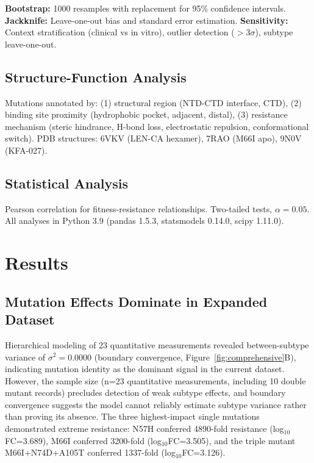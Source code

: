 \documentclass[preprint]{elsarticle}
\begin{document}
\textbf{Bootstrap:} 1000 resamples with replacement for 95\% confidence intervals. \textbf{Jackknife:} Leave-one-out bias and standard error estimation. \textbf{Sensitivity:} Context stratification (clinical vs in vitro), outlier detection ($>3\sigma$), subtype leave-one-out.

\subsection{Structure-Function Analysis}

Mutations annotated by: (1) structural region (NTD-CTD interface, CTD), (2) binding site proximity (hydrophobic pocket, adjacent, distal), (3) resistance mechanism (steric hindrance, H-bond loss, electrostatic repulsion, conformational switch). PDB structures: 6VKV (LEN-CA hexamer), 7RAO (M66I apo), 9N0V (KFA-027).

\subsection{Statistical Analysis}

Pearson correlation for fitness-resistance relationships. Two-tailed tests, $\alpha=0.05$. All analyses in Python 3.9 (pandas 1.5.3, statsmodels 0.14.0, scipy 1.11.0).

\section{Results}

\subsection{Mutation Effects Dominate in Expanded Dataset}

Hierarchical modeling of 23 quantitative measurements revealed between-subtype variance of $\sigma^2=0.0000$ (boundary convergence, Figure~\ref{fig:comprehensive}B), indicating mutation identity as the dominant signal in the current dataset. However, the sample size (n=23 quantitative measurements, including 10 double mutant records) precludes detection of weak subtype effects, and boundary convergence suggests the model cannot reliably estimate subtype variance rather than proving its absence. The three highest-impact single mutations demonstrated extreme resistance: N57H conferred 4890-fold resistance (log$_{10}$FC=3.689), M66I conferred 3200-fold (log$_{10}$FC=3.505), and the triple mutant M66I+N74D+A105T conferred 1337-fold (log$_{10}$FC=3.126).
\end{document}

